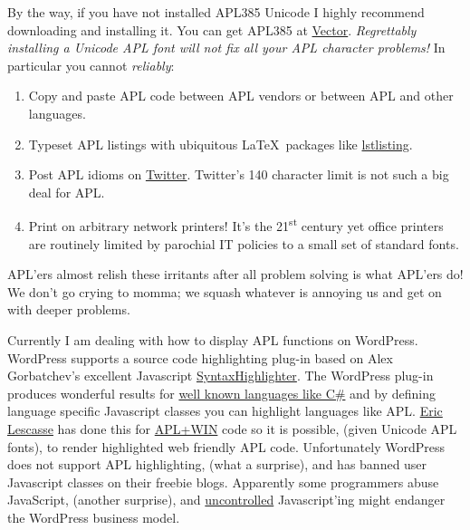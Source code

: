 By the way, if you have not installed APL385 Unicode I highly recommend
downloading and installing it. You can get APL385 at
\href{http://www.vector.org.uk/?area=home}{Vector}. \emph{Regrettably
installing a Unicode APL font will not fix all your APL character
problems!} In particular you cannot \emph{reliably}:

\begin{enumerate}
\item
  Copy and paste APL code between APL vendors or between APL and other
  languages.
\item
  Typeset APL listings with ubiquitous \LaTeX\ packages like
  \href{http://en.wikibooks.org/wiki/LaTeX/Packages/Listings}{lstlisting}.
\item
  Post APL idioms on \href{http://twitter.com/}{Twitter}. Twitter's 140
  character limit is not such a big deal for APL.
\item
  Print on arbitrary network printers! It's the 21\textsuperscript{st}
  century yet office printers are routinely limited by parochial IT
  policies to a small set of standard fonts.
\end{enumerate}
APL'ers almost relish these irritants after all problem solving is what
APL'ers do! We don't go crying to momma; we squash whatever is annoying
us and get on with deeper problems.

Currently I am dealing with how to display APL functions on WordPress.
WordPress supports a source code highlighting plug-in based on Alex
Gorbatchev's excellent Javascript
\href{http://alexgorbatchev.com/SyntaxHighlighter/}{SyntaxHighlighter}.
The WordPress plug-in produces wonderful results for
\href{http://bakerjd99.wordpress.com/2010/05/28/a-c-net-class-for-calling-j/}{well
known languages like C\#} and by defining language specific Javascript
classes you can highlight languages like APL.
\href{http://www.lescasse.com/UseAPLFromCSharpExample.aspx}{Eric
Lescasse} has done this for \href{http://www.apl2000.com/}{APL+WIN} code
so it is possible, (given Unicode APL fonts), to render highlighted web
friendly APL code. Unfortunately WordPress does not support APL
highlighting, (what a surprise), and has banned user Javascript classes
on their freebie blogs. Apparently some programmers abuse JavaScript,
(another surprise), and
\href{http://bakerjd99.wordpress.com/2010/06/11/the-real-problem-with-enterprise-software/}{uncontrolled}
Javascript'ing might endanger the WordPress business model.

